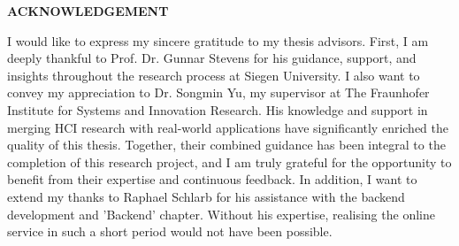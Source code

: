  \setcounter{page}{2}
\begin{center}
    {\Large{\bf{ACKNOWLEDGEMENT}}}
\end{center}

\noindent
I would like to express my sincere gratitude to my thesis advisors. 
First, I am deeply thankful to Prof. Dr. Gunnar Stevens for his guidance, support, and insights throughout the research process at Siegen University. 
I also want to convey my appreciation to Dr. Songmin Yu, my supervisor at The Fraunhofer Institute for Systems and Innovation Research. 
His knowledge and support in merging HCI research with real-world applications have significantly enriched the quality of this thesis.
Together, their combined guidance has been integral to the completion of this research project, and I am truly grateful for the opportunity to benefit from their expertise and continuous feedback. 
In addition, I want to extend my thanks to Raphael Schlarb for his assistance with the backend development and 'Backend' chapter. 
Without his expertise, realising the online service in such a short period would not have been possible.
\clearpage